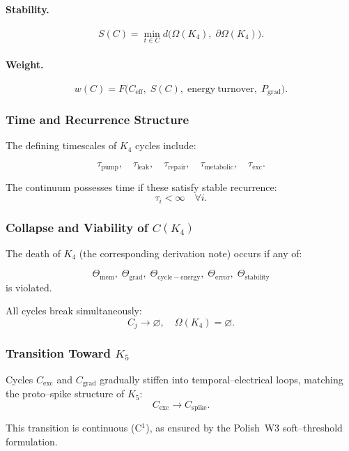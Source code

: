 \paragraph{Stability.}
\[
  S(C) 
   = \min_{t\in C}
       d\bigl(
         \Omega(K_4),\;
         \partial\Omega(K_4)
       \bigr).
\]

\paragraph{Weight.}
\[
  w(C)=F\bigl(
        C_{\mathrm{eff}},\;
        S(C),\;
        \mathrm{energy\ turnover},\;
        P_{\mathrm{grad}}
      \bigr).
\]

\subsubsection{Time and Recurrence Structure}

The defining timescales of $K_4$ cycles include:

\[
  \tau_{\mathrm{pump}},\quad
  \tau_{\mathrm{leak}},\quad
  \tau_{\mathrm{repair}},\quad
  \tau_{\mathrm{metabolic}},\quad
  \tau_{\mathrm{exc}}.
\]

The continuum possesses time if these satisfy stable recurrence:
\[
  \tau_i<\infty \quad\forall i.
\]

\subsubsection{Collapse and Viability of \texorpdfstring{$C(K_4)$}{C(K_4)}}

The death of $K_4$ (the corresponding derivation note) occurs if any of:

\[
  \Theta_{\mathrm{mem}},\;
  \Theta_{\mathrm{grad}},\;
  \Theta_{\mathrm{cycle-energy}},\;
  \Theta_{\mathrm{error}},\;
  \Theta_{\mathrm{stability}}
\]
is violated.

All cycles break simultaneously:
\[
  C_j \to \varnothing,
\quad
  \Omega(K_4)=\varnothing.
\]

\subsubsection{Transition Toward \texorpdfstring{$K_5$}{K_5}}

Cycles $C_{\mathrm{exc}}$ and $C_{\mathrm{grad}}$ gradually 
stiffen into temporal–electrical loops, matching the 
proto–spike structure of $K_5$:
\[
  C_{\mathrm{exc}}\longrightarrow C_{\mathrm{spike}}.
\]

This transition is continuous (C$^1$), as ensured by 
the Polish~W3 soft–threshold formulation.
